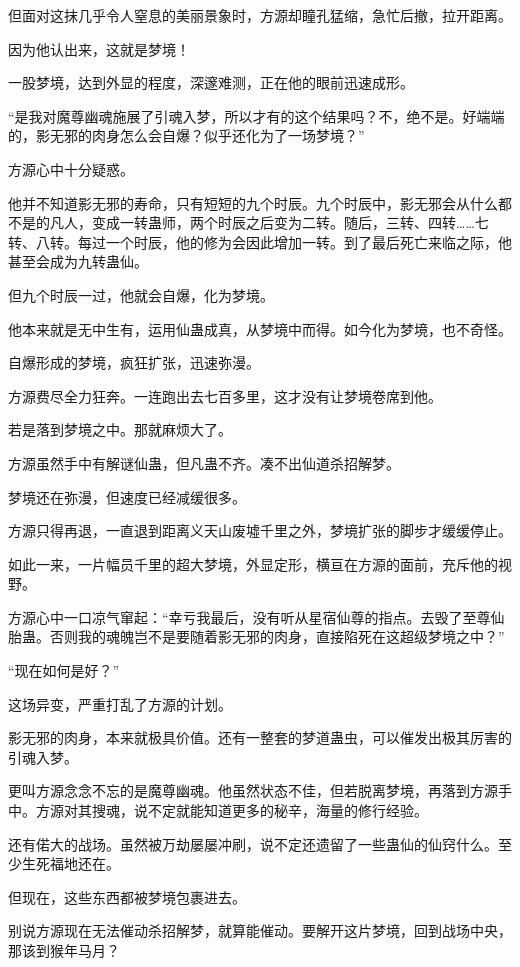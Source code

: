 \begin{this_body}
但面对这抹几乎令人窒息的美丽景象时，方源却瞳孔猛缩，急忙后撤，拉开距离。

因为他认出来，这就是梦境！

一股梦境，达到外显的程度，深邃难测，正在他的眼前迅速成形。

“是我对魔尊幽魂施展了引魂入梦，所以才有的这个结果吗？不，绝不是。好端端的，影无邪的肉身怎么会自爆？似乎还化为了一场梦境？”

方源心中十分疑惑。

他并不知道影无邪的寿命，只有短短的九个时辰。九个时辰中，影无邪会从什么都不是的凡人，变成一转蛊师，两个时辰之后变为二转。随后，三转、四转……七转、八转。每过一个时辰，他的修为会因此增加一转。到了最后死亡来临之际，他甚至会成为九转蛊仙。

但九个时辰一过，他就会自爆，化为梦境。

他本来就是无中生有，运用仙蛊成真，从梦境中而得。如今化为梦境，也不奇怪。

自爆形成的梦境，疯狂扩张，迅速弥漫。

方源费尽全力狂奔。一连跑出去七百多里，这才没有让梦境卷席到他。

若是落到梦境之中。那就麻烦大了。

方源虽然手中有解谜仙蛊，但凡蛊不齐。凑不出仙道杀招解梦。

梦境还在弥漫，但速度已经减缓很多。

方源只得再退，一直退到距离义天山废墟千里之外，梦境扩张的脚步才缓缓停止。

如此一来，一片幅员千里的超大梦境，外显定形，横亘在方源的面前，充斥他的视野。

方源心中一口凉气窜起：“幸亏我最后，没有听从星宿仙尊的指点。去毁了至尊仙胎蛊。否则我的魂魄岂不是要随着影无邪的肉身，直接陷死在这超级梦境之中？”

“现在如何是好？”

这场异变，严重打乱了方源的计划。

影无邪的肉身，本来就极具价值。还有一整套的梦道蛊虫，可以催发出极其厉害的引魂入梦。

更叫方源念念不忘的是魔尊幽魂。他虽然状态不佳，但若脱离梦境，再落到方源手中。方源对其搜魂，说不定就能知道更多的秘辛，海量的修行经验。

还有偌大的战场。虽然被万劫屡屡冲刷，说不定还遗留了一些蛊仙的仙窍什么。至少生死福地还在。

但现在，这些东西都被梦境包裹进去。

别说方源现在无法催动杀招解梦，就算能催动。要解开这片梦境，回到战场中央，那该到猴年马月？


\end{this_body}
